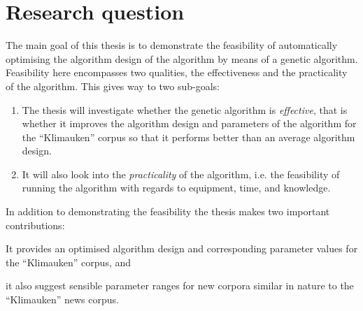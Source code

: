 

\section{Research question}

The main goal of this thesis is to demonstrate the feasibility of automatically optimising the algorithm design of the \CTC algorithm by means of a genetic algorithm.
Feasibility here encompasses two qualities, the effectiveness and the practicality of the algorithm. This gives way to two sub-goals:
\begin{enumerate}
\item The thesis will investigate whether the genetic algorithm is \emph{effective}, that is whether it improves the algorithm design and parameters of the \CTC algorithm for the ``Klimauken'' corpus so that it performs better than an average algorithm design.
\item It will also look into the \emph{practicality} of the algorithm, i.e. the feasibility of running the algorithm with regards to equipment, time, and knowledge.
\end{enumerate}

In addition to demonstrating the feasibility the thesis makes two important contributions:
\begin{inparaenum}[\itshape 1\upshape)]
\item It provides an optimised algorithm design and corresponding parameter values for the ``Klimauken'' corpus, and
\item it also suggest sensible parameter ranges for new corpora similar in nature to the ``Klimauken'' news corpus.
\end{inparaenum}

